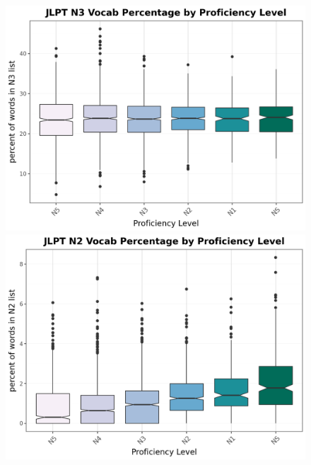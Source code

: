 \begin{figure}[htbp]
    \centering
    \begin{minipage}{.48\textwidth}
        \centering
    \includegraphics[scale=.4]{img/LFP/JLPT_N3}
    \caption[Percentage of tokens used from JLPT N3 List]{}
        \label{fig:JLPTN3vocab}
    \end{minipage}
    \hfill
\begin{minipage}{.48\textwidth}
        \centering
        \includegraphics[scale=.4]{img/LFP/JLPT_N2}
        \caption[Percentage of tokens used from JLPT N2 List]{}
\label{fig:JLPTN2vocab}
\end{minipage}
    \end{figure}

